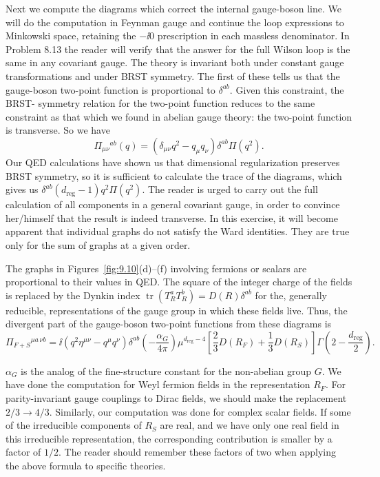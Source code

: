 Next we compute the diagrams which correct the internal gauge-boson line. We
will do the computation in Feynman gauge and continue the loop expressions to
Minkowski space, retaining the $-\ii0$ prescription in each massless
denominator. In Problem 8.13 the reader will verify
that the answer for the full Wilson loop is the same in any covariant gauge.
The theory is invariant both under constant gauge transformations and under
BRST symmetry. The first of these tells us that the gauge-boson two-point
function is proportional to $\delta^{ab}$. Given this constraint, the BRST-
symmetry relation for the two-point function reduces to the same constraint as
that which we found in abelian gauge theory: the two-point function is
transverse. So we have
\[
  \Pi_{\mu\nu}{}^{ab}(q)=
  (\delta_{\mu\nu}q^2-q_\mu q_\nu)\delta^{ab}\Pi(q^2).
\]
Our QED calculations have shown us that dimensional regularization preserves
BRST symmetry, so it is sufficient to calculate the trace of the diagrams,
which gives us $\delta^{ab}(d_{\mathrm{reg}}-1)q^2\Pi(q^2)$. The reader is urged to carry out
the full calculation of all components in a general covariant gauge, in order
to convince her/himself that the result is indeed transverse. In this exercise,
it will become apparent that individual graphs do not satisfy the Ward
identities. They are true only for the sum of graphs at a given order.


The graphs in Figures~\ref{fig:9.10}(d)--(f) involving fermions or scalars are
proportional to their values in QED. The square of the integer charge of the
fields is replaced by the Dynkin index
$\operatorname{tr}(T_R^aT_R^b)=D(R)\delta^{ab}$ for the, generally reducible,
representations of the gauge group in which these fields live. Thus, the
divergent part of the gauge-boson two-point functions from these diagrams is
\begin{equation}
  \Pi_{F+S}{}^{\mu a\,\nu b}
  =\ii(q^2\eta^{\mu\nu}-q^\mu q^\nu)\delta^{ab}
  \left(-\frac{\alpha_G}{4\pi}\right)\mu^{d_{\mathrm{reg}}-4}
  \left[\frac23D(R_F)+\frac13D(R_S)\right]
  \Gamma\!\left(2-\frac {d_{\mathrm{reg}}}{2}\right).
\label{eq:9.7}
\end{equation}

$\alpha_G$ is the analog of the fine-structure constant for the non-abelian
group $G$. We have done the computation for Weyl fermion fields in the
representation $R_F$. For parity-invariant gauge couplings to Dirac fields, we
should make the replacement $2/3\to4/3$. Similarly, our computation was done
for complex scalar fields. If some of the irreducible components of $R_S$ are
real, and we have only one real field in this irreducible representation, the
corresponding contribution is smaller by a factor of $1/2$. The reader should
remember these factors of two when applying the above formula to specific
theories.

